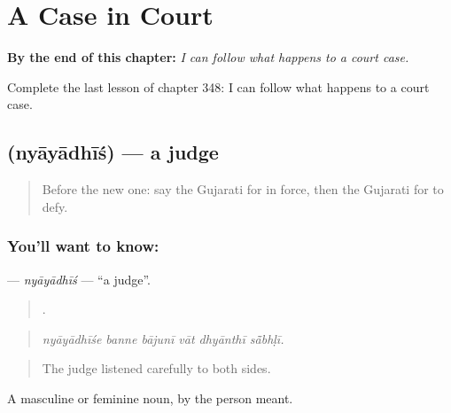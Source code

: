 
\chapter{A Case in Court}
\label{ch:gu-a-case-in-court}

\begin{chapteropening}
\textbf{By the end of this chapter:} \emph{I can follow what happens to a court case.}

Complete the last lesson of chapter 348: I can follow what happens to a court case.
\end{chapteropening}

\section[\texorpdfstring{\gu{ન્યાયાધીશ} (nyāyādhīś)}{ન્યાયાધીશ (nyāyādhīś)}]{ (nyāyādhīś) — a judge}

\label{lesson:GU-C348-nyayadhis}



\begin{quote}
Before the new one: say the Gujarati for in force, then the Gujarati for to defy.
\end{quote}

\subsection*{You'll want to know: }
\textbf{} — \emph{nyāyādhīś} — \textquotedblleft{}a judge\textquotedblright{}.

\begin{quote}
     .
\end{quote}

\begin{quote}
\emph{nyāyādhīśe banne bājunī vāt dhyānthī sā̃bhḷī.}
\end{quote}

\begin{quote}
The judge listened carefully to both sides.
\end{quote}

A masculine or feminine noun, by the person meant.

